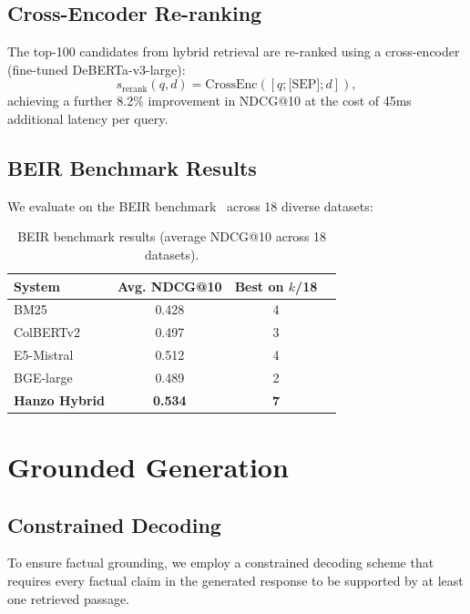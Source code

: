 \documentclass[11pt,twocolumn]{article}
\begin{document}
\subsection{Cross-Encoder Re-ranking}

The top-100 candidates from hybrid retrieval are re-ranked using a cross-encoder (fine-tuned DeBERTa-v3-large):
\begin{equation}
s_{\text{rerank}}(q, d) = \text{CrossEnc}([q; \text{[SEP]}; d]),
\end{equation}
achieving a further 8.2\% improvement in NDCG@10 at the cost of 45ms additional latency per query.

\subsection{BEIR Benchmark Results}

We evaluate on the BEIR benchmark~\cite{thakur2021beir} across 18 diverse datasets:

\begin{table}[H]
\centering
\small
\begin{tabular}{lccc}
\toprule
\textbf{System} & \textbf{Avg. NDCG@10} & \textbf{Best on $k$/18} \\
\midrule
BM25 & 0.428 & 4 \\
ColBERTv2 & 0.497 & 3 \\
E5-Mistral & 0.512 & 4 \\
BGE-large & 0.489 & 2 \\
\textbf{Hanzo Hybrid} & \textbf{0.534} & \textbf{7} \\
\bottomrule
\end{tabular}
\caption{BEIR benchmark results (average NDCG@10 across 18 datasets).}
\label{tab:beir}
\end{table}

\section{Grounded Generation}
\label{sec:generation}

\subsection{Constrained Decoding}

To ensure factual grounding, we employ a constrained decoding scheme that requires every factual claim in the generated response to be supported by at least one retrieved passage.
\end{document}
